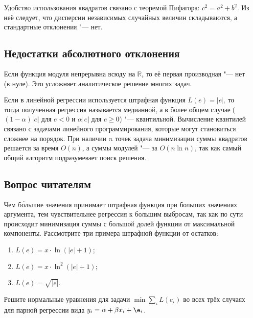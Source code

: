 \documentclass[11pt]{article}
\begin{document}
Удобство использования квадратов связано с теоремой Пифагора: $c^2 = a^2 + b^2$. Из неё следует, что дисперсии независимых случайных величин складываются, а стандартные отклонения "--- нет. 

\subsection{Недостатки абсолютного отклонения}

Если функция модуля непрерывна всюду на $\mathbb{R}$, то её первая производная "--- нет (в нуле). Это усложняет аналитическое решение многих задач.

Если в линейной регрессии используется штрафная функция $L(e) = |e|$, то тогда полученная регрессия называется медианной, а в более общем случае ($(1-\alpha)|e|$ для $e<0$ и $\alpha|e|$ для $e\ge0$) "--- квантильной. Вычисление квантилей связано с задачами линейного программирования, которые могут становиться сложнее на порядок. При наличии $n$ точек задача минимизации суммы квадратов решается за время $O(n)$, а суммы модулей "--- за $O(n \ln n)$, так как самый общий алгоритм подразумевает поиск решения.

%


\subsection{Вопрос читателям}

Чем б\'{о}льшие значения принимает штрафная функция при больших значениях аргумента, тем чувствительнее регрессия к большим выбросам, так как по сути происходит минимизация суммы с большой долей функции от максимальной компоненты. Рассмотрите три примера штрафной функции от остатков:
\begin{enumerate}
	\item $L(e) = x\cdot \ln (|e|+1)$;
	\item $L(e) = x\cdot \ln^2 (|e|+1)$;
	\item $L(e) = \sqrt{|e|}$.
\end{enumerate}
Решите нормальные уравнения для задачи $\min \sum\limits_i L(e_i)$ во всех трёх случаях для парной регрессии вида $y_i = \alpha + \beta x_i + \e_i$. 
\end{document}
